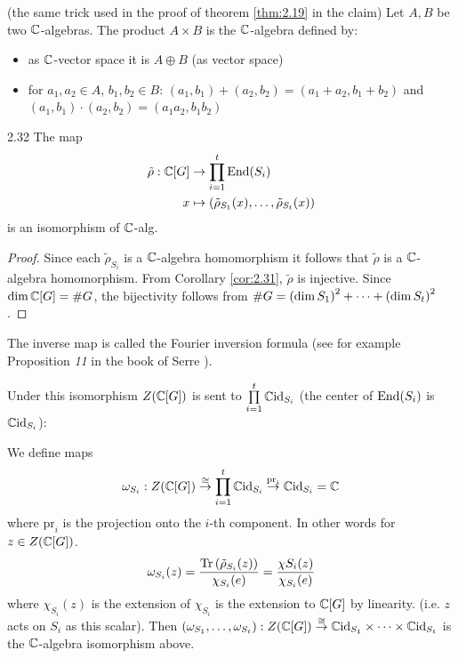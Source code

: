 \documentclass[twoside = false,	%
		headsepline,		%
		parskip = true,
		]{scrbook}						%
\begin{document}
    (the same trick used in the proof of theorem \ref{thm:2.19} in the claim)
    Let $A,B$ be two $\mathbb C$-algebras. The product $A \times B$ is the $\mathbb C$-algebra defined by:
    \begin{itemize}
        \item as $\mathbb C$-vector space it is $A \oplus B$ (as vector space)
        \item for $a_1,a_2 \in A$, $b_1,b_2 \in B$:
            $(a_1,b_1) + (a_2,b_2) = (a_1 + a_2, b_1 + b_2)$ and $(a_1,b_1) \cdot (a_2,b_2) = (a_1a_2, b_1 b_2)$
    \end{itemize}
    \begin{corollary}{}{2.32}
        The map
        \begin{equation*}
        \begin{split}
            \tilde \rho: \mathbb C[G] &\to \prod_{i=1}^t \mathrm{End}(S_i) \\
                            x &\mapsto \left( \tilde{\rho}_{S_1}(x),\dots,\tilde{\rho}_{S_t}(x)\right)
        \end{split}
        \end{equation*}
        is an isomorphism of $\mathbb C$-alg.
    \end{corollary}
    \begin{proof}
        Since each $\tilde \rho_{S_i}$ is a $\mathbb C$-algebra homomorphism it follows that $\tilde{\rho}$ is a $\mathbb C$-algebra homomorphism. From Corollary \ref{cor:2.31}, $\tilde{\rho}$ is injective. Since $\dim \mathbb C[G] = \# G$, the bijectivity follows from $\#G = \left( \dim S_1\right)^2 + \dots + \left( \dim S_t\right)^2$.
    \end{proof}
    The inverse map is called the Fourier inversion formula (see for example Proposition \textit{11} in the book of Serre \cite{Serre.1977}).

    Under this isomorphism $Z(\mathbb C[G])$ is sent to $\prod\limits_{i=1}^t \mathbb C \mathrm{id}_{S_i}$ (the center of $\mathrm{End}(S_i)$ is $\mathbb C \mathrm{id}_{S_i}$):

    We define maps
    \begin{equation*}
        \omega_{S_i}: Z(\mathbb C[G]) \overset{\cong}{\to} \prod\limits_{i=1}^t \mathbb C \mathrm{id}_{S_i} \overset{\mathrm{pr}_i}{\to} \mathbb C \mathrm{id}_{S_i} = \mathbb C 
    \end{equation*}
    where $\mathrm{pr}_i$ is the projection onto the $i$-th component. In other words for $z \in Z(\mathbb C[G])$.
    \begin{equation*}
        \omega_{S_i}(z) = \frac{\mathrm{Tr}\left( \tilde \rho_{S_i}(z)\right)}{\chi_{S_i}(e)} = \frac{\chi{S_i}(z)}{\chi_{S_i}(e)}
    \end{equation*}
    where $\chi_{S_i}(z)$ is the extension of $\chi_{S_i}$ is the extension to $\mathbb C[G]$ by linearity.
    (i.e. $z$ acts on $S_i$ as this scalar). Then $(\omega_{S_1},\dots ,\omega_{S_t}): Z(\mathbb C[G]) \overset{\cong}{\to} \mathbb C \mathrm{id}_{S_1} \times\dots \times \mathbb C \mathrm{id}_{S_t}$ is the $\mathbb C$-algebra isomorphism above.
    
\end{document}
